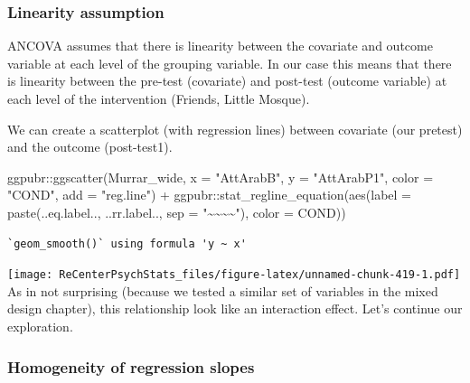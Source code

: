 \documentclass[
  11pt,
]{book}
\newenvironment{Shaded}{\begin{snugshade}}{\end{snugshade}}
\newcommand{\AttributeTok}[1]{\textcolor[rgb]{0.77,0.63,0.00}{#1}}
\newcommand{\FunctionTok}[1]{\textcolor[rgb]{0.00,0.00,0.00}{#1}}
\newcommand{\NormalTok}[1]{#1}
\newcommand{\SpecialCharTok}[1]{\textcolor[rgb]{0.00,0.00,0.00}{#1}}
\newcommand{\StringTok}[1]{\textcolor[rgb]{0.31,0.60,0.02}{#1}}
\begin{document}
\hypertarget{linearity-assumption}{%
\subsubsection{Linearity assumption}\label{linearity-assumption}}

ANCOVA assumes that there is linearity between the covariate and outcome variable at each level of the grouping variable. In our case this means that there is linearity between the pre-test (covariate) and post-test (outcome variable) at each level of the intervention (Friends, Little Mosque).

We can create a scatterplot (with regression lines) between covariate (our pretest) and the outcome (post-test1).

\begin{Shaded}
\begin{Highlighting}[]
\NormalTok{ggpubr}\SpecialCharTok{::}\FunctionTok{ggscatter}\NormalTok{(Murrar\_wide, }\AttributeTok{x =} \StringTok{"AttArabB"}\NormalTok{, }\AttributeTok{y =} \StringTok{"AttArabP1"}\NormalTok{, }\AttributeTok{color =} \StringTok{"COND"}\NormalTok{,}
    \AttributeTok{add =} \StringTok{"reg.line"}\NormalTok{) }\SpecialCharTok{+}\NormalTok{ ggpubr}\SpecialCharTok{::}\FunctionTok{stat\_regline\_equation}\NormalTok{(}\FunctionTok{aes}\NormalTok{(}\AttributeTok{label =} \FunctionTok{paste}\NormalTok{(..eq.label..,}
\NormalTok{    ..rr.label.., }\AttributeTok{sep =} \StringTok{"\textasciitilde{}\textasciitilde{}\textasciitilde{}\textasciitilde{}"}\NormalTok{), }\AttributeTok{color =}\NormalTok{ COND))}
\end{Highlighting}
\end{Shaded}

\begin{verbatim}
`geom_smooth()` using formula 'y ~ x'
\end{verbatim}

\texttt{[image: ReCenterPsychStats\_files/figure-latex/unnamed-chunk-419-1.pdf]}
As in not surprising (because we tested a similar set of variables in the mixed design chapter), this relationship look like an interaction effect. Let's continue our exploration.

\hypertarget{homogeneity-of-regression-slopes}{%
\subsubsection{Homogeneity of regression slopes}\label{homogeneity-of-regression-slopes}}
\end{document}
